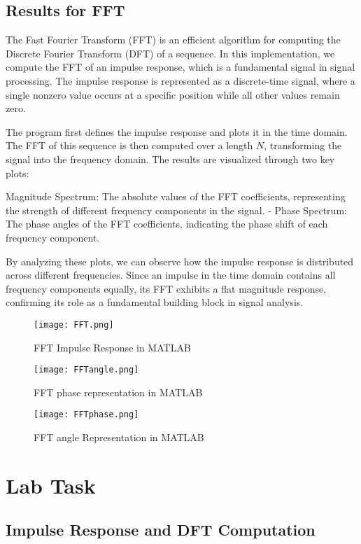 \documentclass[a4paper,12pt]{article}
\begin{document}
\subsection{Results for FFT}
The Fast Fourier Transform (FFT) is an efficient algorithm for computing the Discrete Fourier Transform (DFT) of a sequence. In this implementation, we compute the FFT of an impulse response, which is a fundamental signal in signal processing. The impulse response is represented as a discrete-time signal, where a single nonzero value occurs at a specific position while all other values remain zero.

The program first defines the impulse response and plots it in the time domain. The FFT of this sequence is then computed over a length \( N \), transforming the signal into the frequency domain. The results are visualized through two key plots: 

Magnitude Spectrum: The absolute values of the FFT coefficients, representing the strength of different frequency components in the signal.
- Phase Spectrum: The phase angles of the FFT coefficients, indicating the phase shift of each frequency component.

By analyzing these plots, we can observe how the impulse response is distributed across different frequencies. Since an impulse in the time domain contains all frequency components equally, its FFT exhibits a flat magnitude response, confirming its role as a fundamental building block in signal analysis.

\begin{figure}[h]
    \centering
    \texttt{[image: FFT.png]}
    \caption{FFT Impulse Response in MATLAB}
    \label{fig:dft_result}
\end{figure}
\begin{figure}[h]
    \centering
    \texttt{[image: FFTangle.png]}
    \caption{FFT phase representation in MATLAB}
    \label{fig:dft_result}
\end{figure}
\begin{figure}[h]
    \centering
    \texttt{[image: FFTphase.png]}
    \caption{FFT angle Representation in MATLAB}
    \label{fig:dft_result}
\end{figure}
\section{Lab Task}
\subsection{Impulse Response and DFT Computation}
\end{document}

